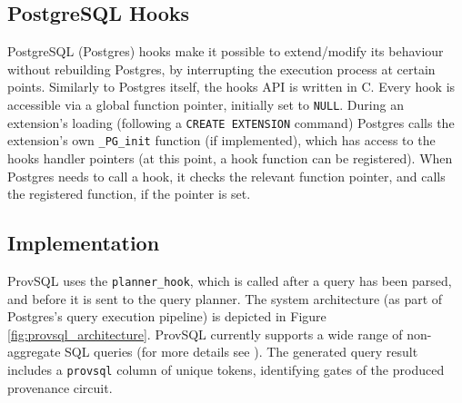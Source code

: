 \subsection{PostgreSQL Hooks} PostgreSQL (Postgres) hooks \cite{postgre_hooks} make it possible to extend/modify its behaviour without rebuilding Postgres, by interrupting the execution process at certain points. Similarly to Postgres itself, the hooks API is written in C. Every hook is accessible via a global function pointer, initially set to \texttt{NULL}. During an extension's loading (following a \texttt{CREATE EXTENSION} command) Postgres calls the extension's own \texttt{\_PG\_init} function (if implemented), which has access to the hooks handler pointers (at this point, a hook function can be registered). When Postgres needs to call a hook, it checks the relevant function pointer, and calls the registered function, if the pointer is set.
\subsection{Implementation} ProvSQL \cite{provsql_github} uses the \texttt{planner\_hook}, which is called after a query has been parsed, and before it is sent to the query planner. The system architecture (as part of Postgres's query execution pipeline) is depicted in Figure \ref{fig:provsql_architecture}.
ProvSQL currently supports a wide range of non-aggregate SQL queries (for more details see \cite{provsql_github, Senellart2018}). The generated query result includes a \texttt{provsql} column of unique\footnotemark
{}
tokens, identifying gates of the produced provenance circuit.



